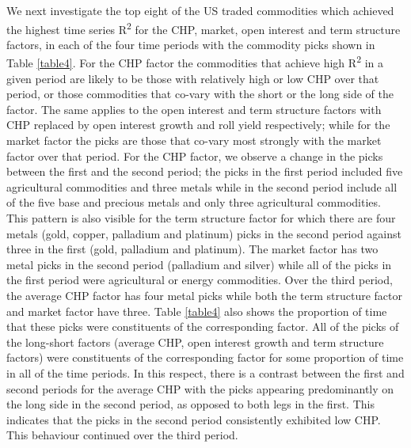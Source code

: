 \documentclass[]{elsarticle} %
\begin{document}
We next investigate the top eight of the US traded commodities which
achieved the highest time series R\textsuperscript{2} for the CHP,
market, open interest and term structure factors, in each of the four
time periods with the commodity picks shown in Table \ref{table4}. For
the CHP factor the commodities that achieve high R\textsuperscript{2} in
a given period are likely to be those with relatively high or low CHP
over that period, or those commodities that co-vary with the short or
the long side of the factor. The same applies to the open interest and
term structure factors with CHP replaced by open interest growth and
roll yield respectively; while for the market factor the picks are those
that co-vary most strongly with the market factor over that period. For
the CHP factor, we observe a change in the picks between the first and
the second period; the picks in the first period included five
agricultural commodities and three metals while in the second period
include all of the five base and precious metals and only three
agricultural commodities. This pattern is also visible for the term
structure factor for which there are four metals (gold, copper,
palladium and platinum) picks in the second period against three in the
first (gold, palladium and platinum). The market factor has two metal
picks in the second period (palladium and silver) while all of the picks
in the first period were agricultural or energy commodities. Over the
third period, the average CHP factor has four metal picks while both the
term structure factor and market factor have three. Table \ref{table4}
also shows the proportion of time that these picks were constituents of
the corresponding factor. All of the picks of the long-short factors
(average CHP, open interest growth and term structure factors) were
constituents of the corresponding factor for some proportion of time in
all of the time periods. In this respect, there is a contrast between
the first and second periods for the average CHP with the picks
appearing predominantly on the long side in the second period, as
opposed to both legs in the first. This indicates that the picks in the
second period consistently exhibited low CHP. This behaviour continued
over the third period.
\end{document}
